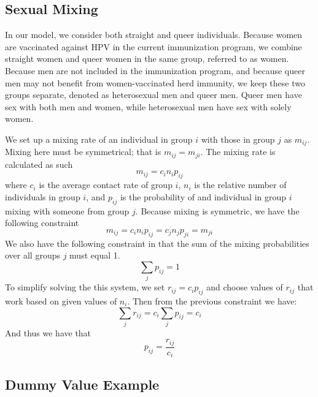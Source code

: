 \documentclass[12pt]{article}
\begin{document}
\subsection*{Sexual Mixing}

In our model, we consider both straight and queer individuals.  Because women are vaccinated against HPV in the current immunization program, we combine straight women and queer women in the same group, referred to as women.  Because men are not included in the immunization program, and because queer men may not benefit from women-vaccinated herd immunity, we keep these two groups separate, denoted as heterosexual men and queer men.  Queer men have sex with both men and women, while heterosexual men have sex with solely women.  

We set up a mixing rate of an individual in group $i$ with those in group $j$ as $m_{ij}$.  Mixing here must be symmetrical; that is $m_{ij}=m_{ji}$.  The mixing rate is calculated as such
\begin{equation}
m_{ij} = c_i n_i p_{ij}
\end{equation}
where $c_i$ is the average contact rate of group $i$, $n_i$ is the relative number of individuals in group $i$, and $p_{ij}$ is the probability of and individual in group $i$ mixing with someone from group $j$.  Because mixing is symmetric, we have the following constraint
\begin{equation}
m_{ij} = c_i n_i p_{ij} = c_j n_j p_{ji} = m_{ji}
\end{equation}
We also have the following constraint in that the sum of the mixing probabilities over all groups $j$ must equal 1. 
\begin{equation}
\sum_j p_{ij} = 1
\end{equation}
To simplify solving the this system, we set $r_{ij}=c_ip_{ij}$ and choose values of $r_{ij}$ that work based on given values of $n_i$.  Then from the previous constraint we have:
\begin{equation}\label{eq:ContRateEq}
\sum_j r_{ij} = c_i \sum_j p_{ij} = c_i
\end{equation}
And thus we have that 
\begin{equation}\label{eq:ProbEq}
p_{ij}=\frac{r_{ij}}{c_i}
\end{equation}

\subsection*{Dummy Value Example}
\end{document}
